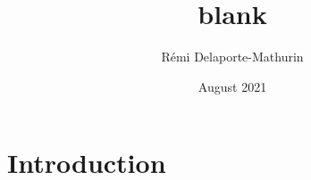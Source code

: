 \documentclass{article}
\title{blank}
\author{Rémi Delaporte-Mathurin}
\date{August 2021}
\begin{document}
\maketitle

\section{Introduction}
\end{document}
